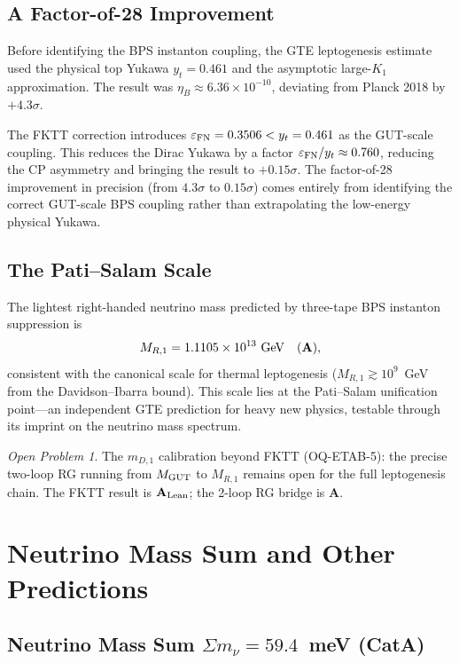 \documentclass[11pt,openany]{book}
\theoremstyle{remark}
\newtheorem{openprob}{Open Problem}[chapter]
\newcommand{\CatA}{\textbf{A}}
\newcommand{\CatAL}{\ensuremath{\textbf{A}_{\rm Lean}}}
\begin{document}
\subsection*{A Factor-of-28 Improvement}

Before identifying the BPS instanton coupling, the GTE leptogenesis estimate used
the physical top Yukawa $y_t = 0.461$ and the asymptotic large-$K_1$ approximation.
The result was $\eta_B \approx 6.36 \times 10^{-10}$, deviating from Planck 2018
by $+4.3\sigma$.

The FKTT correction introduces $\varepsilon_{\rm FN} = 0.3506 < y_t = 0.461$
as the GUT-scale coupling.
This reduces the Dirac Yukawa by a factor $\varepsilon_{\rm FN}/y_t \approx 0.760$,
reducing the CP asymmetry and bringing the result to $+0.15\sigma$.
The factor-of-28 improvement in precision (from $4.3\sigma$ to $0.15\sigma$)
comes entirely from identifying the correct GUT-scale BPS coupling rather than
extrapolating the low-energy physical Yukawa.

\subsection*{The Pati--Salam Scale}

The lightest right-handed neutrino mass predicted by three-tape BPS instanton suppression is
\[
  M_{R,1}
  = 1.1105 \times 10^{13}~{\rm GeV}
  \quad (\CatA),
\]
consistent with the canonical scale for thermal leptogenesis
($M_{R,1} \gtrsim 10^9$~GeV from the Davidson--Ibarra bound).
This scale lies at the Pati--Salam unification point---an independent GTE prediction
for heavy new physics, testable through its imprint on the neutrino mass spectrum.

\begin{openprob}
The $m_{D,1}$ calibration beyond FKTT (OQ-ETAB-5): the precise two-loop RG running
from $M_{\rm GUT}$ to $M_{R,1}$ remains open for the full leptogenesis chain.
The FKTT result is \CatAL; the 2-loop RG bridge is \CatA.
\end{openprob}

\section{Neutrino Mass Sum and Other Predictions}
\label{sec:cosmo_other}

\subsection*{Neutrino Mass Sum \texorpdfstring{$\Sigma m_\nu = 59.4$~meV}{Sum m_nu = 59.4 meV} (CatA)}
\end{document}
